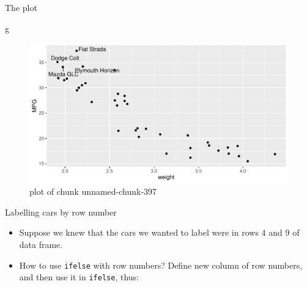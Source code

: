 \documentclass[ignorenonframetext,]{beamer}
\newenvironment{Shaded}{\begin{snugshade}}{\end{snugshade}}
\newcommand{\DataTypeTok}[1]{\textcolor[rgb]{0.13,0.29,0.53}{#1}}
\newcommand{\DecValTok}[1]{\textcolor[rgb]{0.00,0.00,0.81}{#1}}
\newcommand{\KeywordTok}[1]{\textcolor[rgb]{0.13,0.29,0.53}{\textbf{#1}}}
\newcommand{\NormalTok}[1]{#1}
\newcommand{\OperatorTok}[1]{\textcolor[rgb]{0.81,0.36,0.00}{\textbf{#1}}}
\newcommand{\StringTok}[1]{\textcolor[rgb]{0.31,0.60,0.02}{#1}}
\providecommand{\tightlist}{%
  \setlength{\itemsep}{0pt}\setlength{\parskip}{0pt}}
\begin{document}
\begin{frame}[fragile]{The plot}
\protect\hypertarget{the-plot-5}{}

\begin{Shaded}
\begin{Highlighting}[]
\NormalTok{g}
\end{Highlighting}
\end{Shaded}

\begin{figure}
\centering
\includegraphics{figure/unnamed-chunk-397-1.pdf}
\caption{plot of chunk unnamed-chunk-397}
\end{figure}

\end{frame}

\begin{frame}[fragile]{Labelling cars by row number}
\protect\hypertarget{labelling-cars-by-row-number}{}

\begin{itemize}
\tightlist
\item
  Suppose we knew that the cars we wanted to label were in rows 4 and 9
  of data frame.
\item
  How to use \texttt{ifelse} with row numbers? Define new column of row
  numbers, and then use it in \texttt{ifelse}, thus:
\end{itemize}

\begin{Shaded}
\end{Shaded}

\end{frame}
\end{document}
